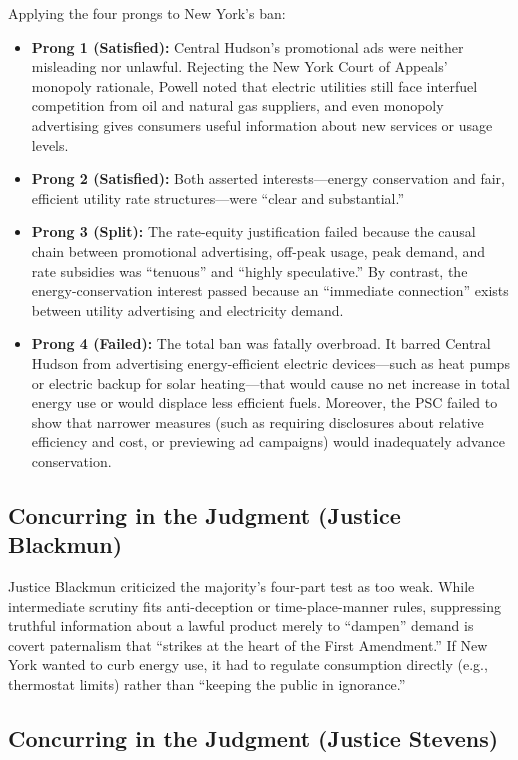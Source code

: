 \documentclass[12pt]{article}
\begin{document}
Applying the four prongs to New York's ban:
\begin{itemize}
  \item \textbf{Prong 1 (Satisfied):} Central Hudson's promotional ads were neither misleading nor unlawful. Rejecting the New York Court of Appeals' monopoly rationale, Powell noted that electric utilities still face interfuel competition from oil and natural gas suppliers, and even monopoly advertising gives consumers useful information about new services or usage levels.
  \item \textbf{Prong 2 (Satisfied):} Both asserted interests---energy conservation and fair, efficient utility rate structures---were ``clear and substantial.''
  \item \textbf{Prong 3 (Split):} The rate-equity justification failed because the causal chain between promotional advertising, off-peak usage, peak demand, and rate subsidies was ``tenuous'' and ``highly speculative.'' By contrast, the energy-conservation interest passed because an ``immediate connection'' exists between utility advertising and electricity demand.
  \item \textbf{Prong 4 (Failed):} The total ban was fatally overbroad. It barred Central Hudson from advertising energy-efficient electric devices---such as heat pumps or electric backup for solar heating---that would cause no net increase in total energy use or would displace less efficient fuels. Moreover, the PSC failed to show that narrower measures (such as requiring disclosures about relative efficiency and cost, or previewing ad campaigns) would inadequately advance conservation.
\end{itemize}

\subsection{Concurring in the Judgment (Justice Blackmun)}

Justice Blackmun criticized the majority's four-part test as too weak. While intermediate scrutiny fits anti-deception or time-place-manner rules, suppressing truthful information about a lawful product merely to ``dampen'' demand is covert paternalism that ``strikes at the heart of the First Amendment.'' If New York wanted to curb energy use, it had to regulate consumption directly (e.g., thermostat limits) rather than ``keeping the public in ignorance.''

\subsection{Concurring in the Judgment (Justice Stevens)}
\end{document}
